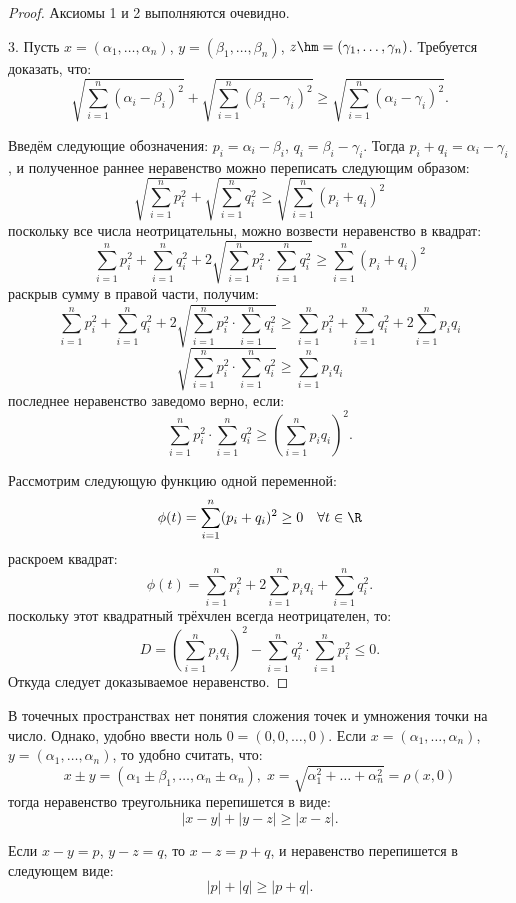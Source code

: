 \begin{proof}
Аксиомы 1 и 2 выполняются очевидно.

3. Пусть \(x = (\alpha_1, \dots, \alpha_n)\), \(y = (\beta_1, \dots, \beta_n)\),
\(z \hm = (\gamma_1, \dots, \gamma_n)\). Требуется доказать, что:
\[
    \sqrt{\sum_{i=1}^n (\alpha_i - \beta_i)^2} + \sqrt{\sum_{i=1}^n (\beta_i -
        \gamma_i)^2} \geq \sqrt{\sum_{i=1}^n (\alpha_i - \gamma_i)^2}.
\]

Введём следующие обозначения: \(p_i = \alpha_i - \beta_i\), \(q_i = \beta_i -
\gamma_i\). Тогда \(p_i + q_i = \alpha_i - \gamma_i\), и полученное раннее
неравенство можно переписать следующим образом:
\[
    \sqrt{\sum_{i=1}^n p_i^2} + \sqrt{\sum_{i=1}^n q_i^2} \geq
        \sqrt{\sum_{i=1}^n (p_i + q_i)^2}
\]
поскольку все числа неотрицательны, можно возвести неравенство в квадрат:
\[
    \sum_{i=1}^n p_i^2 + \sum_{i=1}^n q_i^2 + 2\sqrt{\sum_{i=1}^n p_i^2 \cdot
        \sum_{i=1}^n q_i^2} \geq \sum_{i=1}^n (p_i + q_i)^2
\]
раскрыв сумму в правой части, получим:
\[
    \sum_{i=1}^n p_i^2 + \sum_{i=1}^n q_i^2 + 2\sqrt{\sum_{i=1}^n p_i^2 \cdot
        \sum_{i=1}^n q_i^2} \geq \sum_{i=1}^n p_i^2 + \sum_{i=1}^n q_i^2 +
        2\sum_{i=1}^n p_i q_i
\]
\[
    \sqrt{\sum_{i=1}^n p_i^2 \cdot \sum_{i=1}^n q_i^2} \geq \sum_{i=1}^n p_i q_i
\]
последнее неравенство заведомо верно, если:
\[
    \sum_{i=1}^n p_i^2 \cdot \sum_{i=1}^n q_i^2 \geq \left(\sum_{i=1}^n p_i
        q_i\right)^2.
\]

Рассмотрим следующую функцию одной переменной:
\[
    \phi(t) = \sum_{i=1}^n (p_i + q_i)^2 \geq 0 \quad \forall t \in \R
\]
раскроем квадрат:
\[
    \phi(t) = \sum_{i=1}^n p_i^2 + 2\sum_{i=1}^n p_i q_i + \sum_{i=1}^n q_i^2.
\]
поскольку этот квадратный трёхчлен всегда неотрицателен, то:
\[
    D = \left(\sum_{i = 1}^n p_i q_i\right)^2 - \sum_{i=1}^n q_i^2 \cdot
        \sum_{i=1}^n p_i^2 \leq 0.
\]
Откуда следует доказываемое неравенство.
\end{proof}

\begin{note}
В точечных пространствах нет понятия сложения точек и умножения точки на число.
Однако, удобно ввести ноль \(0 = (0, 0, \dots, 0)\). Если \(x = (\alpha_1, \dots,
\alpha_n)\), \(y = (\alpha_1, \dots, \alpha_n)\), то удобно считать, что:
\[
    x \pm y = (\alpha_1 \pm \beta_1, \dots, \alpha_n \pm \alpha_n), \;
        x = \sqrt{\alpha_1^2 + \dots + \alpha_n^2} = \rho(x, 0)
\]
тогда неравенство треугольника перепишется в виде:
\[
    |x - y| + |y - z| \geq |x - z|.
\]

Если \(x - y = p\), \(y - z = q\), то \(x - z = p + q\), и неравенство
перепишется в следующем виде:
\[
    |p| + |q| \geq |p + q|.
\]
\end{note}

